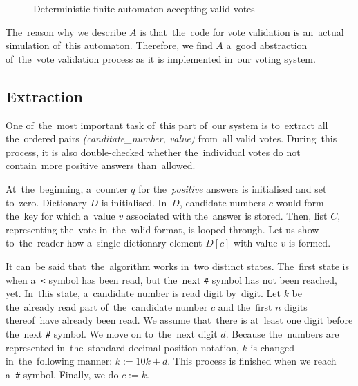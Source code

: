 \begin{figure}[h]
\begin{center}
\label{fig:automaton}
\end{center}
\caption{Deterministic finite automaton accepting valid votes}
\end{figure}

The~reason why we describe $A$ is that~the~code for vote validation is an~actual simulation of~this automaton. Therefore, we find $A$ a~good abstraction of~the~vote validation process as it is implemented in~our voting system.



\subsection{Extraction}
One of~the~most important task of~this part of~our system is to~extract all the~ordered pairs \emph{(canditate\_number, value)} from~all valid votes. During~this process, it is also double-checked whether the~individual votes do not contain~more positive answers than~allowed.

At~the~beginning, a~counter $q$ for the~\emph{positive} answers is initialised and set to~zero. Dictionary $D$ is initialised. In~$D$, candidate numbers $c$ would form the~key for which a~value $v$ associated with the~answer is stored. Then, list $C$, representing the~vote in~the~valid format, is looped through. Let us show to~the~reader how a~single dictionary element $D[c]$ with value $v$ is formed.
 
It can~be said that~the~algorithm works in~two distinct states. The~first state is when a~\texttt{<} symbol has been read, but the~next \texttt{\#} symbol has not been reached, yet. In~this state, a~candidate number is read digit by~digit. Let $k$ be the~already read part of~the~candidate number $c$ and the~first $n$ digits thereof~have already been read. We assume that~there is at~least one digit before the~next \texttt{\#} symbol. We move on to~the~next digit $d$. Because the~numbers are represented in~the~standard decimal position notation, $k$ is changed in~the~following manner: $k:= 10k + d$. This process is finished when we reach a~\texttt{\#} symbol. Finally, we do $c:=k$.

